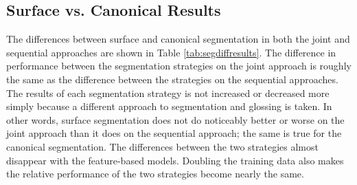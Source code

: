 \subsection{Surface vs. Canonical Results}

The differences between surface and canonical segmentation in both the joint and sequential approaches are shown in Table \ref{tab:segdiffresults}. The difference in performance between the segmentation strategies on the joint approach is roughly the same as the difference between the strategies on the sequential approaches. The results of each segmentation strategy is not increased or decreased more simply because a different approach to segmentation and glossing is taken. In other words, surface segmentation does not do noticeably better or worse on the joint approach than it does on the sequential approach; the same is true for the canonical segmentation. The differences between the two strategies almost disappear with the feature-based models. Doubling the training data also makes the relative performance of the two strategies become nearly the same.


